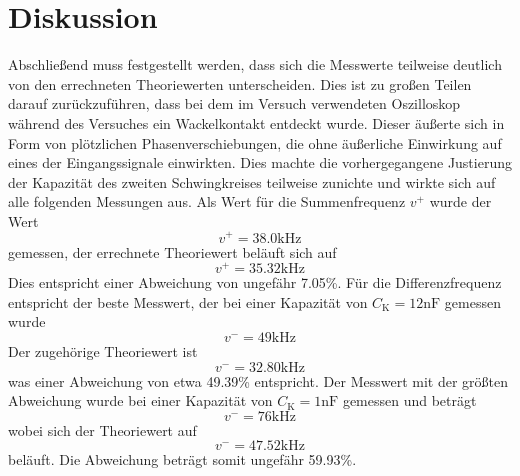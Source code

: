\section{Diskussion}
\label{sec:Diskussion}
Abschließend muss festgestellt werden, dass sich die Messwerte teilweise deutlich von den errechneten Theoriewerten unterscheiden. Dies ist zu großen Teilen darauf zurückzuführen, dass bei
dem im Versuch verwendeten Oszilloskop während des Versuches ein Wackelkontakt entdeckt wurde. Dieser äußerte sich in Form von plötzlichen Phasenverschiebungen, die ohne äußerliche
Einwirkung auf eines der Eingangssignale einwirkten. Dies machte die vorhergegangene Justierung der Kapazität des zweiten Schwingkreises teilweise zunichte und wirkte sich auf alle
folgenden Messungen aus.
\newline
Als Wert für die Summenfrequenz $ v^{+} $ wurde der Wert
\begin{equation*}
    v^{+} = 38.0 \si{\kilo\hertz}
\end{equation*}
gemessen, der errechnete Theoriewert beläuft sich auf
\begin{equation*}
    v^{+} = 35.32 \si{\kilo\hertz}
\end{equation*}
Dies entspricht einer Abweichung von ungefähr 7.05\%.
\newline
Für die Differenzfrequenz entspricht der beste Messwert, der bei einer Kapazität von $C_{\text{K}} = 12 \si{\nano\farad}$ gemessen wurde
\begin{equation*}
    v^{-} = 49 \si{\kilo\hertz}
\end{equation*}
Der zugehörige Theoriewert ist
\begin{equation*}
    v^{-} = 32.80 \si{\kilo\hertz}
\end{equation*}
was einer Abweichung von etwa 49.39\% entspricht.
\newline
Der Messwert mit der größten Abweichung wurde bei einer Kapazität von $C_{\text{K}} = 1 \si{\nano\farad}$ gemessen und beträgt
\begin{equation*}
    v^{-} = 76 \si{\kilo\hertz}
\end{equation*}
wobei sich der Theoriewert auf
\begin{equation*}
    v^{-} = 47.52 \si{\kilo\hertz}
\end{equation*}
beläuft. Die Abweichung beträgt somit ungefähr 59.93\%.